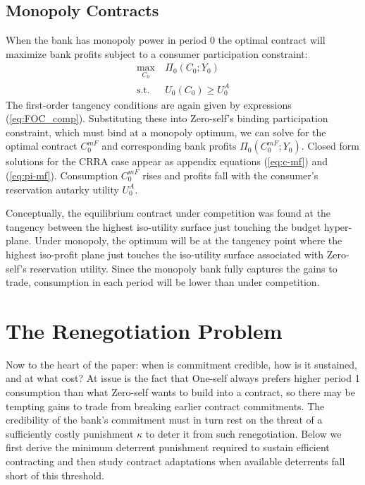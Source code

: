\documentclass[11pt,english]{article}
\theoremstyle{plain}
\theoremstyle{definition}
\begin{document}
\subsection{Monopoly Contracts}

\label{sec:own}

When the bank has monopoly power in period 0 the optimal contract
will maximize bank profits subject to a consumer participation constraint:
\begin{align}
\max_{C_{0}} & \ \Pi_{0}\left(C_{0};Y_{0}\right)\label{eq:monop-obj}\\
\text{s.t.} & \ U_{0}\left(C_{0}\right)\geq U_{0}^{A}\label{eq:CPC0}
\end{align}
The first-order tangency conditions are again given by expressions
(\ref{eq:FOC_comp}). Substituting these into Zero-self's binding participation
constraint, which must bind at a monopoly optimum, we can solve
for the optimal contract $C_{0}^{mF}$ and corresponding bank profits
$\Pi_{0}\left(C_{0}^{mF};Y_{0}\right)$. Closed form solutions for
the CRRA case appear as appendix equations (\ref{eq:c-mf}) and (\ref{eq:pi-mf}).
Consumption $C_{0}^{mF}$ rises and profits fall with the consumer's
reservation autarky utility $U_{0}^{A}$.

Conceptually, the equilibrium contract under competition was found
at the tangency between the highest iso-utility surface just touching
the budget hyper-plane. Under monopoly, the optimum will
be at the tangency point where the highest iso-profit plane just touches
the iso-utility surface associated with Zero-self's reservation utility.
Since the monopoly bank fully captures the gains to trade, consumption
in each period will be lower than under competition. 

\section{The Renegotiation Problem}

\label{renegotiation}

Now to  the heart of the paper: when is commitment credible,
how is it sustained, and at what cost? At issue is the fact that One-self
always prefers higher period 1 consumption than what Zero-self wants
to build into a contract, so there may be tempting gains to trade
from breaking earlier contract commitments. The credibility of the
bank's commitment must in turn rest on the threat of a sufficiently
costly punishment $\kappa$ to deter it from such renegotiation.
Below we first derive the minimum deterrent punishment required to
sustain efficient contracting and then study contract adaptations when available deterrents fall short of this threshold.
\end{document}

